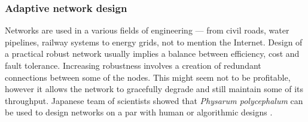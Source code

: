 \documentclass[english,a4paper,twoside]{ppfcmthesis}
\begin{document}
\subsubsection{Adaptive network design}

Networks are used in a various fields of engineering --- from civil roads, water pipelines, railway systems to energy grids, not to mention the Internet. Design of a practical robust network usually implies a balance between efficiency, cost and fault tolerance. Increasing robustness involves a creation of redundant connections between some of the nodes. This might seem not to be profitable, however it allows the network to gracefully degrade and still maintain some of its throughput. Japanese team of scientists showed that \textit{Physarum polycephalum} can be used to design networks on a par with human or algorithmic designs \cite{tero2010rules}.
\end{document}
